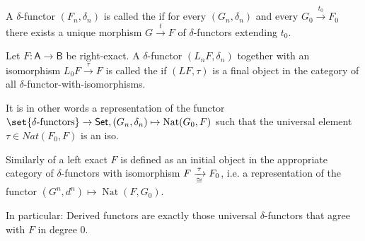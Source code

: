 \documentclass[fontsize=11pt,fleqn,a4paper]{scrartcl}
\begin{document}
\begin{definition}
A $\delta$-functor $(F_n,\delta_n)$ is called the  if for every $(G_n,\delta_n)$ and every $G_0 \xrightarrow{t_0} F_0$ there exists a unique morphism $G \xrightarrow{t} F$ of $\delta$-functors extending $t_0$.
\end{definition}

\begin{definition}
Let $F: \mathsf{A} \to \mathsf{B}$ be right-exact. A $\delta$-functor $(L_nF,\delta_n)$ together with an isomorphism $L_0 F \xrightarrow{\tau} F$ is called the  if $(LF,\tau)$ is a final object in the category of all $\delta$-functor-with-isomorphisms.

It is in other words a representation of the functor $\set{\delta\text{-functors}} \to \mathsf{Set}, (G_n,\delta_n)\mapsto \operatorname{Nat}(G_0,F)$ such that the universal element $\tau\in Nat(F_0,F)$ is an iso.

\medbreak
Similarly  of a left exact $F$ is defined as an initial object in the appropriate category of $\delta$-functors with isomorphism $F\xrightarrow[\cong]{\tau} F_0$, i.e. a representation of the functor $(G^n,d^n) \mapsto \operatorname{Nat}(F,G_0)$.
\end{definition}

\begin{remark}
In particular: Derived functors are exactly those universal $\delta$-functors that agree with $F$ in degree $0$.
\end{remark}
\end{document}
